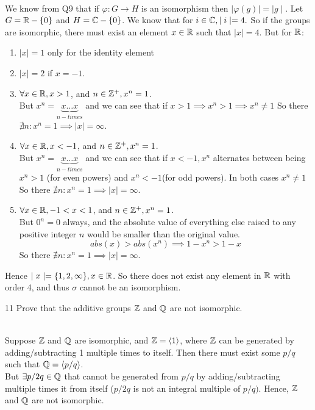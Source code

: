 \documentclass[12pt]{article}
\begin{document}
\begin{solution}
    \bbni \\ 
    We know from Q9 that if $\varphi: G \to H$ is an isomorphism then $\mid \varphi(g) \mid  =  \mid g \mid$. Let $G = \mathbb R - \{0\}$ and $H = \mathbb C - \{0\}$. We know that for $i \in \mathbb C, \mid i \mid = 4. $ So if the groups are isomorphic, there must exist an element $x \in \mathbb R$ such that $\mid x \mid = 4.$ But for $\mathbb R$: 
    \begin{enumerate}
        \item $\mid x \mid = 1$ only for the identity element
        \item $\mid x \mid  = 2$ if $x = -1$. 
        \item  $\forall x \in \mathbb R, x > 1$, and $n \in \mathbb Z^+, x^n = 1$. \\
        But $x^n = \underbrace{x\ldots x}_{n-times}$ and we can see that if $x > 1 \implies x^n > 1 \implies x^n \neq 1$
        So there $\nexists n: x^n  = 1 \implies \mid x \mid = \infty$.
        \item $\forall x \in \mathbb R, x < -1$, and $n \in \mathbb Z^+, x^n = 1$. \\
        But $x^n = \underbrace{x\ldots x}_{n-times}$ and we can see that if $x < -1, x^n$ alternates between being $x^n > 1$ (for even powers) and $x^n<-1$(for odd powers). In both cases $x^n \neq 1$
        So there $\nexists n: x^n  = 1 \implies \mid x \mid = \infty$.
        \item  $\forall x \in \mathbb R, -1 < x < 1$, and $n \in \mathbb Z^+, x^n = 1$. \\
        But $0^n = 0$ always, and the absolute value of everything else raised to any positive integer $n$ would be smaller than the original value. 
        \[abs(x) > abs(x^n) \implies 1 - x^n > 1- x \]              So there $\nexists n: x^n  = 1 \implies \mid x \mid = \infty$.

    \end{enumerate}
    Hence $\mid x \mid = \{1, 2, \infty\}, x\in \mathbb R$. So there does not exist any element in $\mathbb R$ with order 4, and thus $\sigma$ cannot be an isomorphism.   
\end{solution} 

\newpage
\begin{problem}{11}
    Prove that the additive groups $\mathbb Z$ and $\mathbb Q$ are not isomorphic. 
\end{problem} 

\begin{solution}
    \bbni \\
    Suppose $\mathbb Z$ and $\mathbb Q$ are isomorphic, and $\mathbb Z = \langle 1\rangle$, where $\mathbb Z$ can be generated by adding/subtracting 1 multiple times to itself. Then there must exist some $p/q$ such that $\mathbb Q = \langle p/q \rangle$. \\
    But $\exists p/2q \in \mathbb Q$ that cannot be generated from $p/q$ by adding/subtracting multiple times it from itself ($p/2q$ is not an integral multiple of $p/q)$. Hence, $\mathbb Z$ and $\mathbb Q$ are not isomorphic. 
\end{solution}
\end{document}
